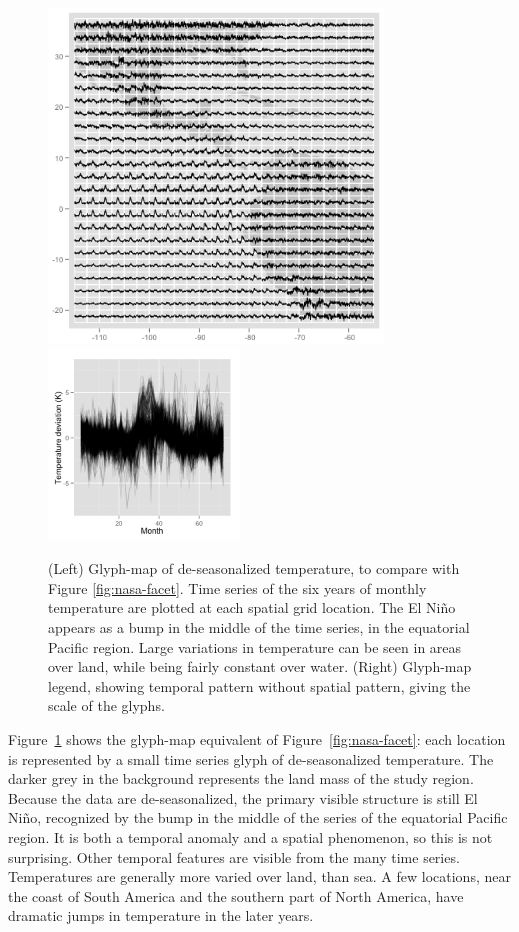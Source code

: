 \documentclass[oneside]{article}
\begin{document}
\begin{figure}[htbp]
  \centering
  \includegraphics[width=3.5in]{nasa-deseas-glyph}
  \includegraphics[width=2in]{nasa-deseas-glyph-leg}
  \caption{(Left) Glyph-map of de-seasonalized temperature, to compare with Figure \ref{fig:nasa-facet}. Time series of the six years of monthly temperature are plotted at each spatial grid location. The El Ni\~no appears as a bump in the middle of the time series, in the equatorial Pacific region. Large variations in temperature can be seen in areas over land, while being fairly constant over water. (Right) Glyph-map legend, showing temporal pattern without spatial pattern, giving the scale of the glyphs.}
  \label{fig:nasa-glyph}
\end{figure}

Figure~\ref{fig:nasa-glyph} shows the glyph-map equivalent of Figure~\ref{fig:nasa-facet}: each location is represented by a small time series glyph of de-seasonalized temperature. The darker grey in the background represents the land mass of the study region. Because the data are de-seasonalized, the primary visible structure is still El Ni\~no, recognized by the bump in the middle of the series of the equatorial Pacific region. It is both a temporal anomaly and a spatial phenomenon, so this is not surprising. Other temporal features are visible from the many time series. Temperatures are generally more varied over land, than sea. A few locations, near the coast of South America and the southern part of North America, have dramatic jumps in temperature in the later years.%
\end{document}
